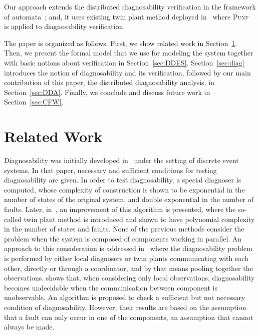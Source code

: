 \documentclass[a4paper]{article}
\newcommand{\punf}           {\textsc{Punf}\xspace}
\begin{document}
Our approach extends the distributed diagnosability verification in the framework of automata~\cite{par_diag}; and, it uses existing twin plant method de\-plo\-yed in~\cite{Madalinski2010} where \punf~\cite{punf} is applied to diagnosability verification. 

The paper is organized as follows. First, we show related work in Section~\ref{sec:RelatedWork}. Then, we present the formal model that we use for modeling the system together with basic notions about verification in Section~\ref{sec:DDES}. Section~\ref{sec:diag} introduces the notion of diagnosability and its verification, followed by our main contribution of this paper, the distributed diagnosability analysis, in Section~\ref{sec:DDA}. Finally, we conclude and discuss future work in Section~\ref{sec:CFW}.

\section{Related Work} \label{sec:RelatedWork}

Diagnosability was initially developed in~\cite{Sampath1995} under the setting of discrete event systems. In that paper, necessary and sufficient conditions for testing diagnosability are given. In order to test diagnosability, a special diagnoser is computed, whose complexity of construction is shown to be exponential in the number of states of the original system, and double exponential in the number of faults. Later, in~\cite{twin}, an improvement of this algorithm is presented, where the so-called twin plant method is introduced and shown to have polynomial complexity in the number of states and faults. 
None of the previous methods consider the problem when the system is composed of components working in parallel. An approach to this consideration is addressed in~\cite{Schumann07scalablediagnosability,Debouk_acoordinated,distributeddiag,SchumannH08} where the diagnosability problem is performed by either local diagnosers or twin plants communicating with each other, directly or through a coordinator, and by that means pooling together the observations. \cite{YeDagueValid} shows that, when considering only local observations, diagnosability becomes undecidable when the communication between component is unobservable. An algorithm is proposed to check a sufficient but not necessary condition of diagnosability. However, their results are based on the assumption that a fault can only occur in one of the components, an assumption that cannot always be made.
\end{document}
